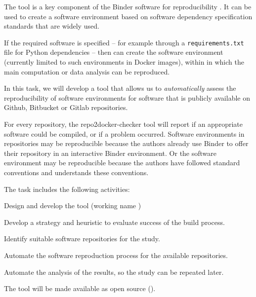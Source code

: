 \begin{task}[
  title=Towards quantifiable progress for reproducible software environments,
  id=repo2docker-checker,
  lead=SRL,
  PM=12,
  wphases={0-24},
  partners={MP}
  ]
The \repotodocker tool is a key component of the Binder software for
reproducibility . It can be used to create a software environment based on software
dependency specification standards that are widely used.

If the required software is specified -- for example through a
\texttt{requirements.txt} file for Python dependencies -- then
\repotodocker{} can create the software environment (currently limited to such
environments in Docker images), within in which the main computation or data
analysis can be reproduced.

In this task, we will develop a tool that allows us to \emph{automatically} assess the
reproducibility of software environments for software that is publicly available on
Github, Bitbucket or Gitlab repositories.

For every repository, the repo2docker-checker tool will report if an appropriate
software could be compiled, or if a problem occurred. Software environments in
repositories may be reproducible because the authors already use Binder to offer
their repository in an interactive Binder environment. Or the software
environment may be reproducible because the authors have followed standard
conventions 
and \repotodocker{} understands these conventions.

The task includes the following activities:
  \begin{compactitem}
  \item Design and develop the tool (working name
    )
  \item Develop a strategy and heuristic to evaluate success of the build
    process.
  \item Identify suitable software repositories for the study.
  \item Automate the software reproduction process for the available
    repositories.
  \item Automate the analysis of the results, so the study can be repeated later.
  \end{compactitem}
  The tool will be made available as open source ().
\end{task}
